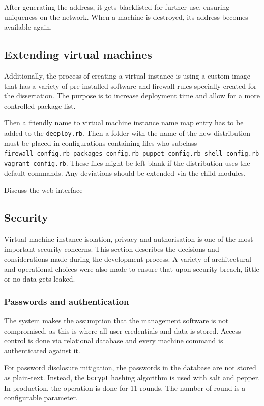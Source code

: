 \documentclass{article}
\begin{document}
After generating the address, it gets blacklisted for further use, ensuring uniqueness on the network. When a machine is destroyed, its address becomes available again.

\subsection{Extending virtual machines}
Additionally, the process of creating a virtual instance is using a custom image that has a variety of pre-installed software and firewall rules specially created for the dissertation. The purpose is to increase deployment time and allow for a more controlled package list.

Then a friendly name to virtual machine instance name map entry has to be added to the \texttt{deeploy.rb}. Then a folder with the name of the new distribution must be placed in configurations containing files who subclass \texttt{firewall\_config.rb packages\_config.rb puppet\_config.rb shell\_config.rb vagrant\_config.rb}. These files might be left blank if the distribution uses the default commands. Any deviations should be extended via the child modules.


{\color{red} 
Discuss the web interface
}

\subsection{Security}

Virtual machine instance isolation, privacy and authorisation is one of the most important security concerns. This section describes the decisions and considerations made during the development process. A variety of architectural and operational choices were also made to ensure that upon security breach, little or no data gets leaked.

\subsubsection{Passwords and authentication}
The system makes the assumption that the management software is not compromised, as this is where all user credentials and data is stored.
Access control is done via relational database and every machine command is authenticated against it. 

For password disclosure mitigation, the passwords in the database are not stored as plain-text. Instead, the \texttt{bcrypt} hashing algorithm is used with salt and pepper. In production, the operation is done for 11 rounds. The number of round is a configurable parameter.
\end{document}
